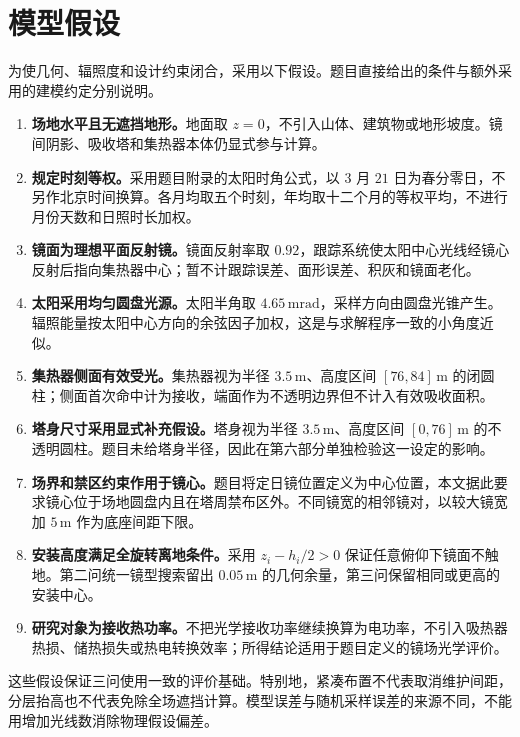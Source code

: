 \pagepart
\section{模型假设}
为使几何、辐照度和设计约束闭合，采用以下假设。题目直接给出的条件与额外采用的建模约定分别说明。
\begin{enumerate}[label=\textbf{假设\arabic*：},leftmargin=4.8em]
\item \textbf{场地水平且无遮挡地形。}地面取 $z=0$，不引入山体、建筑物或地形坡度。镜间阴影、吸收塔和集热器本体仍显式参与计算。
\item \textbf{规定时刻等权。}采用题目附录的太阳时角公式，以 $3$ 月 $21$ 日为春分零日，不另作北京时间换算。各月均取五个时刻，年均取十二个月的等权平均，不进行月份天数和日照时长加权。
\item \textbf{镜面为理想平面反射镜。}镜面反射率取 $0.92$，跟踪系统使太阳中心光线经镜心反射后指向集热器中心；暂不计跟踪误差、面形误差、积灰和镜面老化。
\item \textbf{太阳采用均匀圆盘光源。}太阳半角取 $4.65\,\mathrm{mrad}$，采样方向由圆盘光锥产生。辐照能量按太阳中心方向的余弦因子加权，这是与求解程序一致的小角度近似。
\item \textbf{集热器侧面有效受光。}集热器视为半径 $3.5\,\mathrm m$、高度区间 $[76,84]\,\mathrm m$ 的闭圆柱；侧面首次命中计为接收，端面作为不透明边界但不计入有效吸收面积。
\item \textbf{塔身尺寸采用显式补充假设。}塔身视为半径 $3.5\,\mathrm m$、高度区间 $[0,76]\,\mathrm m$ 的不透明圆柱。题目未给塔身半径，因此在第六部分单独检验这一设定的影响。
\item \textbf{场界和禁区约束作用于镜心。}题目将定日镜位置定义为中心位置，本文据此要求镜心位于场地圆盘内且在塔周禁布区外。不同镜宽的相邻镜对，以较大镜宽加 $5\,\mathrm m$ 作为底座间距下限。
\item \textbf{安装高度满足全旋转离地条件。}采用 $z_i-h_i/2>0$ 保证任意俯仰下镜面不触地。第二问统一镜型搜索留出 $0.05\,\mathrm m$ 的几何余量，第三问保留相同或更高的安装中心。
\item \textbf{研究对象为接收热功率。}不把光学接收功率继续换算为电功率，不引入吸热器热损、储热损失或热电转换效率；所得结论适用于题目定义的镜场光学评价。
\end{enumerate}
这些假设保证三问使用一致的评价基础。特别地，紧凑布置不代表取消维护间距，分层抬高也不代表免除全场遮挡计算。模型误差与随机采样误差的来源不同，不能用增加光线数消除物理假设偏差。

\pagepart
